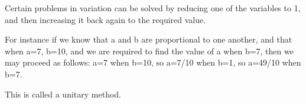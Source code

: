 Certain problems in variation can be solved by reducing one of
the variables to 1, and then increasing it back again to the 
required value. 
\par
For instance if we know that a and b are
proportional to one another, and that when a=7, b=10, and 
we are required to find the value of a when b=7, then we may proceed
as follows: a=7 when b=10, so a=7/10 when b=1, so a=49/10 when b=7.
\par
This is called a unitary method.